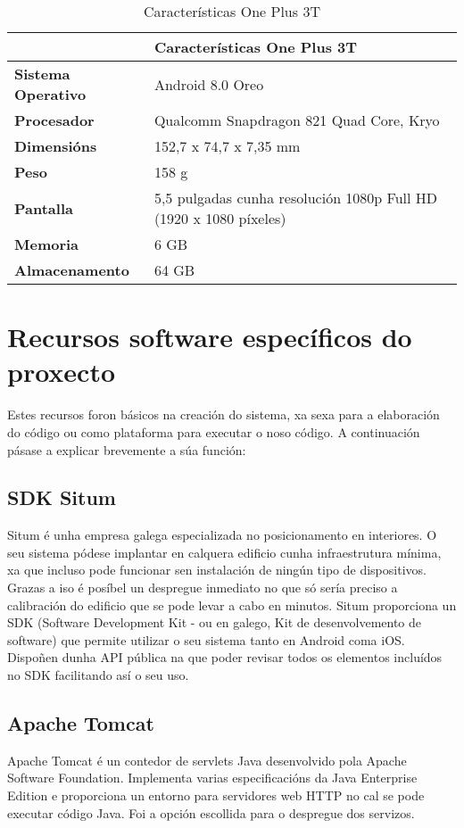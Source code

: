 \begin{table} [tbh]
	\centering
	\footnotesize
	\begin{tabular}{|l|p{10cm}|}
		\hline 
		& \textbf{Características One Plus 3T} \\ 
		\hline 
		\textbf{Sistema Operativo} & Android 8.0 Oreo \\ 
		\hline 
		\textbf{Procesador} & Qualcomm Snapdragon 821 Quad Core, Kryo \\ 
		\hline 
		\textbf{Dimensións} & 152,7 x 74,7 x 7,35 mm \\ 
		\hline 
		\textbf{Peso} & 158 g \\ 
		\hline 
		\textbf{Pantalla} & 5,5 pulgadas cunha resolución 1080p Full HD (1920 x 1080 píxeles) \\ 
		\hline 
		\textbf{Memoria} & 6 GB \\ 
		\hline
		\textbf{Almacenamento} & 64 GB \\ 
		\hline 
	\end{tabular}
	\caption{Características One Plus 3T}
	\label{tab:tabCaracteristicasOnePlus}
\end{table}


\section{Recursos software específicos do proxecto}
Estes recursos foron básicos na creación do sistema, xa sexa para a elaboración do código ou como plataforma para executar o noso código. A continuación pásase a explicar brevemente a súa función:

\subsection{SDK Situm}
Situm é unha empresa galega especializada no posicionamento en interiores. O seu sistema pódese implantar en calquera edificio cunha infraestrutura mínima, xa que incluso pode funcionar sen instalación de ningún tipo de dispositivos. Grazas a iso é posíbel un despregue inmediato no que só sería preciso a calibración do edificio que se pode levar a cabo en minutos. Situm proporciona un SDK (Software Development Kit - ou en galego, Kit de desenvolvemento de software) que permite utilizar o seu sistema tanto en Android coma iOS. Dispoñen dunha API pública na que poder revisar todos os elementos incluídos no SDK facilitando así o seu uso.


\subsection{Apache Tomcat}
Apache Tomcat é un contedor de servlets Java desenvolvido pola Apache Software Foundation. Implementa varias especificacións da Java Enterprise Edition e proporciona un entorno para servidores web HTTP no cal se pode executar código Java. Foi a opción escollida para o despregue dos servizos.


